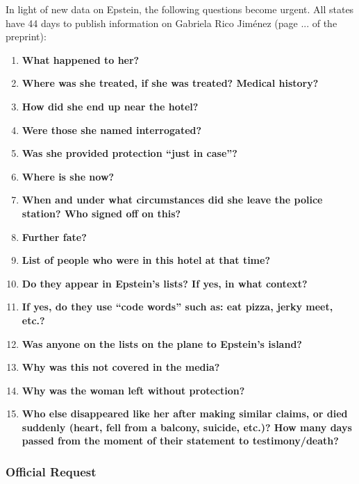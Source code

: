 \documentclass[11pt,a4paper]{article}
\theoremstyle{definition}
\theoremstyle{remark}
\begin{document}
In light of new data on Epstein, the following questions become urgent. All states have 44 days to publish information on Gabriela Rico Jiménez (page ... of the preprint):

\begin{enumerate}
\item \textbf{What happened to her?}
\item \textbf{Where was she treated, if she was treated? Medical history?}
\item \textbf{How did she end up near the hotel?}
\item \textbf{Were those she named interrogated?}
\item \textbf{Was she provided protection ``just in case''?}
\item \textbf{Where is she now?}
\item \textbf{When and under what circumstances did she leave the police station? Who signed off on this?}
\item \textbf{Further fate?}
\item \textbf{List of people who were in this hotel at that time?}
\item \textbf{Do they appear in Epstein's lists? If yes, in what context?}
\item \textbf{If yes, do they use ``code words'' such as: eat pizza, jerky meet, etc.?}
\item \textbf{Was anyone on the lists on the plane to Epstein's island?}
\item \textbf{Why was this not covered in the media?}
\item \textbf{Why was the woman left without protection?}
\item \textbf{Who else disappeared like her after making similar claims, or died suddenly (heart, fell from a balcony, suicide, etc.)? How many days passed from the moment of their statement to testimony/death?}
\end{enumerate}

\subsubsection{Official Request}

\begin{center}
\end{center}
\end{document}
